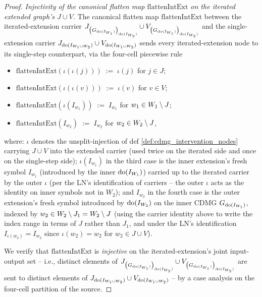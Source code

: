 \documentclass[main]{subfiles}
\providecommand{\flattenIntExt}{\mathrm{flattenIntExt}}
\begin{document}
\begin{proof}
\medskip\noindent\emph{Injectivity of the canonical flatten map $\flattenIntExt$ on the iterated extended graph's $J \cup V$.}
The canonical flatten map $\flattenIntExt$ between the iterated-extension carrier $J_{\left ( G_{\operatorname{do}(I_{W_1})} \right )_{\operatorname{do}(I_{W_2})}} \cup V_{\left ( G_{\operatorname{do}(I_{W_1})} \right )_{\operatorname{do}(I_{W_2})}}$ and the single-extension carrier $J_{\operatorname{do}(I_{W_1 \cup W_2})} \cup V_{\operatorname{do}(I_{W_1 \cup W_2})}$ sends every iterated-extension node to its single-step counterpart, via the four-cell piecewise rule
\begin{itemize}
    \item $\flattenIntExt(\iota(\iota(j))) \;:=\; \iota(j)$ for $j \in J$;
    \item $\flattenIntExt(\iota(\iota(v))) \;:=\; \iota(v)$ for $v \in V$;
    \item $\flattenIntExt(\iota(I_{w_1})) \;:=\; I_{w_1}$ for $w_1 \in W_1 \setminus J$;
    \item $\flattenIntExt(I_{w_2}) \;:=\; I_{w_2}$ for $w_2 \in W_2 \setminus J$,
\end{itemize}
where: $\iota$ denotes the unsplit-injection of def \ref{def:cdmg_intervention_nodes} carrying $J \cup V$ into the extended carrier (used twice on the iterated side and once on the single-step side); $\iota(I_{w_1})$ in the third case is the inner extension's fresh symbol $I_{w_1}$ (introduced by the inner $\operatorname{do}(I_{W_1})$) carried up to the iterated carrier by the outer $\iota$ (per the LN's identification of carriers -- the outer $\iota$ acts as the identity on inner symbols not in $W_2$); and $I_{w_2}$ in the fourth case is the outer extension's fresh symbol introduced by $\operatorname{do}(I_{W_2})$ on the inner CDMG $G_{\operatorname{do}(I_{W_1})}$, indexed by $w_2 \in W_2 \setminus J_1 = W_2 \setminus J$ (using the carrier identity above to write the index range in terms of $J$ rather than $J_1$, and under the LN's identification $I_{\iota(w_2)} = I_{w_2}$ since $\iota(w_2) = w_2$ for $w_2 \in J \cup V$).

We verify that $\flattenIntExt$ is \emph{injective} on the iterated-extension's joint input-output set -- i.e., distinct elements of $J_{\left ( G_{\operatorname{do}(I_{W_1})} \right )_{\operatorname{do}(I_{W_2})}} \cup V_{\left ( G_{\operatorname{do}(I_{W_1})} \right )_{\operatorname{do}(I_{W_2})}}$ are sent to distinct elements of $J_{\operatorname{do}(I_{W_1 \cup W_2})} \cup V_{\operatorname{do}(I_{W_1 \cup W_2})}$ -- by a case analysis on the four-cell partition of the source.


\end{proof}
\end{document}
